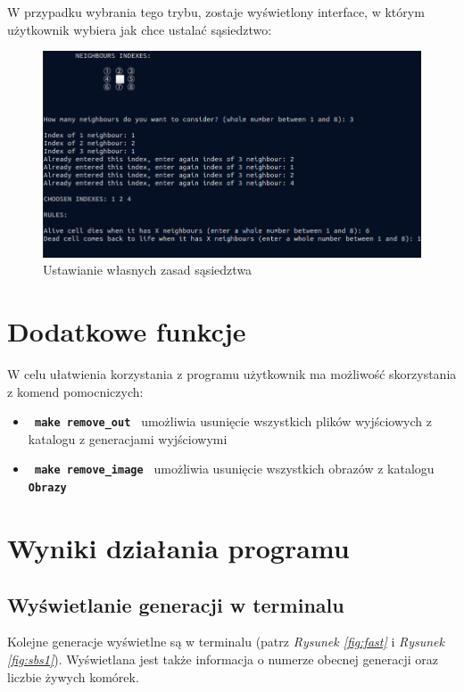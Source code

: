 \documentclass[a4paper]{article}
\begin{document}
\quad W przypadku wybrania tego trybu, zostaje wy\'swietlony interface, w kt\'orym u\.zytkownik wybiera jak chce ustala\'c s\k{a}siedztwo:


\begin{figure}[h!]
	\centering
	\includegraphics[width=\linewidth]{personalmode}
	\caption{Ustawianie w\l{}asnych zasad s\k{a}siedztwa}
        \label{fig:interface}
\end{figure}


\section{Dodatkowe funkcje}
\quad W celu u\l{}atwienia korzystania z programu u\.zytkownik ma mo\.zliwo\'s\'c skorzystania z komend pomocniczych:
\begin{itemize}
	\item \textbf{\texttt{ make remove\_out }} umo\.zliwia usuni\k{e}cie wszystkich plik\'ow wyj\'sciowych z katalogu z generacjami wyj\'sciowymi
	\item \textbf{\texttt{ make remove\_image }} umo\.zliwia usuni\k{e}cie wszystkich obraz\'ow z katalogu \textbf{\texttt{Obrazy}}
\end{itemize}


\section{Wyniki dzia\l{}ania programu}


\subsection{Wy\'swietlanie generacji w terminalu}
\quad Kolejne generacje wy\'swietlne s\k{a} w terminalu (patrz \textit{Rysunek \ref{fig:fast}} i \textit{Rysunek \ref{fig:sbs1}}). 
Wy\'swietlana jest tak\.ze informacja o numerze obecnej generacji oraz liczbie \.zywych kom\'orek.
\end{document}
